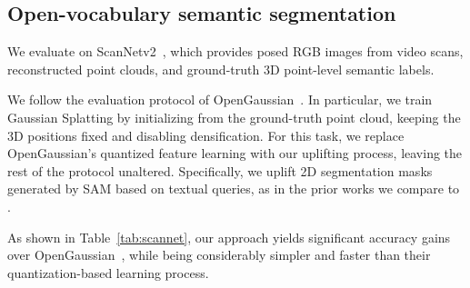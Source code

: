\subsection{Open-vocabulary semantic segmentation}
\label{sec:exp-semantic}

We evaluate on ScanNetv2~\citep{dai2017scannet}, which provides posed RGB images from video scans, reconstructed point clouds, and ground-truth 3D point-level semantic labels.


We follow the evaluation protocol of OpenGaussian~\citep{wu2024opengaussian}.  
In particular, we train Gaussian Splatting by initializing from the ground-truth point cloud, keeping the 3D positions fixed and disabling densification.
For this task, we replace OpenGaussian’s quantized feature learning with our uplifting process, leaving the rest of the protocol unaltered. Specifically, we uplift 2D segmentation masks generated by SAM based on textual queries, as in the prior works we compare to \citep{qin2023langsplat,shi2024legaussians, wu2024opengaussian}.

As shown in Table~\ref{tab:scannet},
our approach yields significant accuracy gains over OpenGaussian~\citep{wu2024opengaussian}, while being considerably simpler and faster than their quantization-based learning process.
